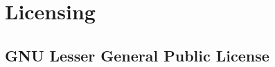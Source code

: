 \section{Licensing}
\label{group__lgpl}
\subsection{GNU Lesser General Public License}\label{group__lgpl_lgpl}

\begin{DoxyCodeInclude}
\end{DoxyCodeInclude}
 